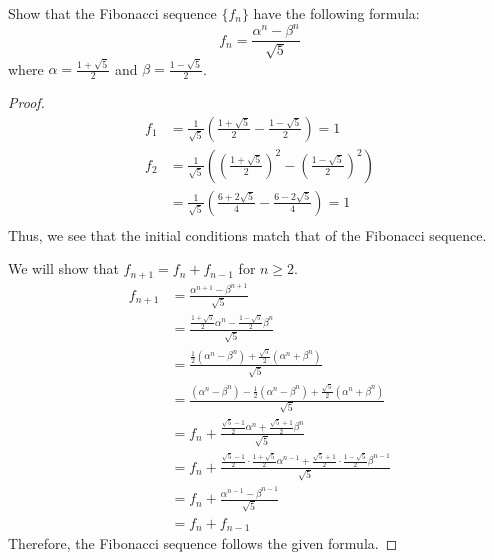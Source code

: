 \documentclass[../main.tex]{subfiles}
\begin{document}
\begin{exercise}
    Show that the Fibonacci sequence $\{f_n\}$ have the following formula:
    \[
        f_n = \frac{\alpha^n - \beta^n}{\sqrt 5}
    \]
    where $\alpha = \frac{1 + \sqrt 5}{2}$ and $\beta = \frac{1 - \sqrt 5}{2}$.
\end{exercise}
\begin{proof}
    \begin{align*}
        f_1 &= \frac{1}{\sqrt 5} \left( \frac{1 + \sqrt 5}{2} - \frac{1 - \sqrt 5}{2}\right) = 1\\
        f_2 &= \frac{1}{\sqrt 5} \left( \left(\frac{1 + \sqrt 5}{2}\right)^2 - \left(\frac{1 - \sqrt 5}{2}\right)^2\right)\\
            &= \frac{1}{\sqrt 5} \left( \frac{6 + 2\sqrt 5}{4} - \frac{6 - 2 \sqrt 5}{4}\right) = 1\\
    \end{align*}
    Thus, we see that the initial conditions match that of the Fibonacci sequence.

    We will show that $f_{n+1} = f_{n} + f_{n-1}$ for $n \geq 2$.
    \begin{align*}
        f_{n + 1} &= \frac{\alpha^{n+1} - \beta^{n+1}}{\sqrt 5}\\
                  &= \frac{\frac{1 + \sqrt 5}{2} \alpha^n - \frac{1 - \sqrt 5}{2} \beta^n}{\sqrt 5}\\
                  &= \frac{\frac 12 (\alpha^n - \beta^n) + \frac{\sqrt 5}{2} (\alpha^n + \beta^n)}{\sqrt 5}\\
                  &= \frac{(\alpha^n - \beta^n) - \frac 12 (\alpha^n - \beta^n) + \frac{\sqrt 5}{2} (\alpha^n + \beta^n)}{\sqrt 5}\\
                  &= f_n + \frac{\frac{\sqrt 5 - 1}{2} \alpha^n + \frac{\sqrt 5 + 1}{2}\beta^n}{\sqrt 5}\\
                  &= f_n + \frac{\frac{\sqrt 5 - 1}{2} \cdot \frac{1 + \sqrt 5}{2} \alpha^{n-1} + \frac{\sqrt 5 + 1}{2} \cdot \frac{1 - \sqrt 5}{2} \beta^{n-1}}{\sqrt 5}\\
                  &= f_n + \frac{\alpha^{n-1} - \beta^{n-1}}{\sqrt 5}\\
                  &= f_n + f_{n-1}
    \end{align*}
    Therefore, the Fibonacci sequence follows the given formula.
\end{proof}
\end{document}
